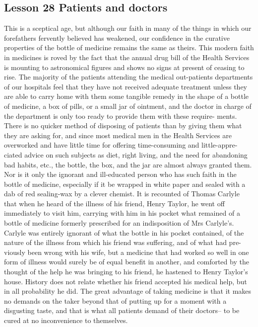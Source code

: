 \documentclass[kindlepaper]{BHCexam4kindle}
\begin{document}
\subsection{Lesson 28
Patients and doctors}
\par
This is a sceptical age, but although our faith in many of the things in which our
forefathers fervently believed has weakened, our confidence in the curative
properties of the bottle of medicine remains the same as theirs. This modern
faith in medicines is roved by the fact that the annual drug bill of the Health
Services is mounting to astronomical figures and shows no signs at present of
ceasing to rise. The majority of the patients attending the medical out-patients
departments of our hospitals feel that they have not received adequate treatment
unless they are able to carry home with them some tangible remedy in the shape
of a bottle of medicine, a box of pills, or a small jar of ointment, and the doctor
in charge of the department is only too ready to provide them with these require-
ments. There is no quicker method of disposing of patients than by giving them
what they are asking for, and since most medical men in the Health Services are
overworked and have little time for offering time-consuming and little-appre-
ciated advice on such subjects as diet, right living, and the need for abandoning
bad habits, etc., the bottle, the box, and the jar are almost always granted them.
Nor is it only the ignorant and ill-educated person who has such faith in the
bottle of medicine, especially if it be wrapped in white paper and sealed with a
dab of red sealing-wax by a clever chemist. It is recounted of Thomas Carlyle
that when he heard of the illness of his friend, Henry Taylor, he went off
immediately to visit him, carrying with him in his pocket what remained of a
bottle of medicine formerly prescribed for an indisposition of Mrs Carlyle's.
Carlyle was entirely ignorant of what the bottle in his pocket contained, of the
nature of the illness from which his friend was suffering, and of what had pre-
viously been wrong with his wife, but a medicine that had worked so well in one
form of illness would surely be of equal benefit in another, and comforted by
the thought of the help he was bringing to his friend, he hastened to Henry
Taylor's house. History does not relate whether his friend accepted his medical
help, but in all probability he did. The great advantage of taking medicine is that
it makes no demands on the taker beyond that of putting up for a moment with a
disgusting taste, and that is what all patients demand of their doctors-- to be
cured at no inconvenience to themselves.
\clearpage
\end{document}
